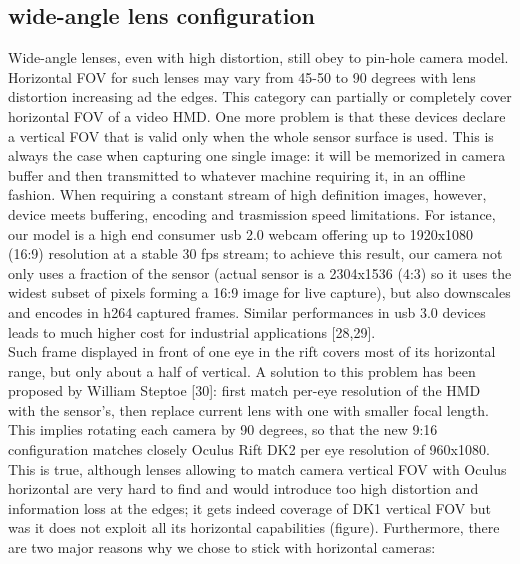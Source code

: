\subsection{wide-angle lens configuration}
Wide-angle lenses, even with high distortion, still obey to pin-hole camera model. Horizontal FOV for such lenses may vary from 45-50 to 90 degrees with lens distortion increasing ad the edges. This category can partially or completely cover horizontal FOV of a video HMD. One more problem is that these devices declare a vertical FOV that is valid only when the whole sensor surface is used. This is always the case when capturing one single image: it will be memorized in camera buffer and then transmitted to whatever machine requiring it, in an offline fashion. When requiring a constant stream of high definition images, however, device meets buffering, encoding and trasmission speed limitations. For istance, our model is a high end consumer usb 2.0 webcam offering up to 1920x1080 (16:9) resolution at a stable 30 fps stream; to achieve this result, our camera not only uses a fraction of the sensor (actual sensor is a 2304x1536 (4:3) so it uses the widest subset of pixels forming a 16:9 image for live capture), but also downscales and encodes in h264 captured frames. Similar performances in usb 3.0 devices leads to much higher cost for industrial applications [28,29].\\
Such frame displayed in front of one eye in the rift covers most of its horizontal range, but only about a half of vertical. A solution to this problem has been proposed by William Steptoe [30]: first match per-eye resolution of the HMD with the sensor’s, then replace current lens with one with smaller focal length. This implies rotating each camera by 90 degrees, so that the new 9:16 configuration matches closely Oculus Rift DK2 per eye resolution of 960x1080. This is true, although lenses allowing to match camera vertical FOV with Oculus horizontal are very hard to find and would introduce too high distortion and information loss at the edges; it gets indeed coverage of DK1 vertical FOV but was it does not exploit all its horizontal capabilities (figure). Furthermore, there are two major reasons why we chose to stick with horizontal cameras:
